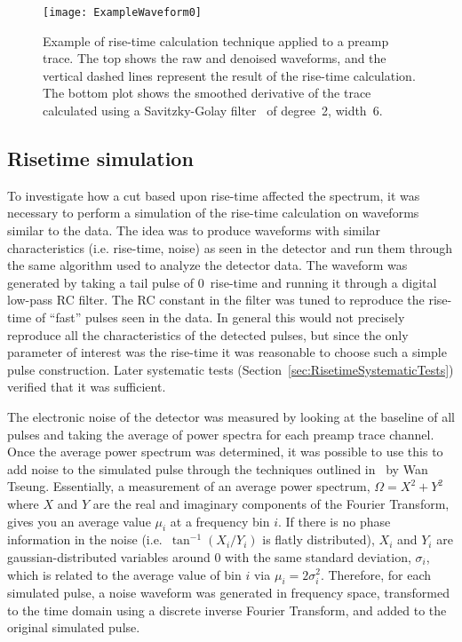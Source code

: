 				\begin{figure}
					\centering
					\texttt{[image: ExampleWaveform0]}
					\caption[Example of rise-time calculation technique applied to a preamp trace]
					{Example of rise-time calculation technique applied to a preamp trace.  
					The top shows the raw and denoised waveforms, and the vertical dashed lines represent the result 
					of the rise-time calculation.  The bottom plot shows the smoothed derivative of the trace calculated 
					using a Savitzky-Golay filter~\cite{Sav64aa} of degree~2, width~6.}
					\label{fig:RisetimeCutsExampleOfPulse}
				\end{figure}					

			\subsection{Risetime simulation}
			\label{sec:RisetimeSimulation}
	
	To investigate how a cut based upon rise-time affected the spectrum, it was necessary to perform a simulation of the rise-time calculation on waveforms similar to the data.  The idea was to produce waveforms with similar characteristics (i.e. rise-time, noise) as seen in the detector and run them through the same algorithm used to analyze the detector data.  The waveform was generated by taking a tail pulse of 0~rise-time and running it through a digital low-pass RC filter.  The RC constant in the filter was tuned to reproduce the rise-time of ``fast'' pulses seen in the data.  In general this would not precisely reproduce all the characteristics of the detected pulses, but since the only parameter of interest was the rise-time it was reasonable to choose such a simple pulse construction.  Later systematic tests (Section~\ref{sec:RisetimeSystematicTests}) verified that it was sufficient.  
	
	The electronic noise of the detector was measured by looking at the baseline of all pulses and taking the average of power spectra for each preamp trace channel.  Once the average power spectrum was determined, it was possible to use this to add noise to the simulated pulse through the techniques outlined in~\cite{WanThesis08} by Wan Tseung.  Essentially, a measurement of an average power spectrum, $\Omega = X^{2} + Y^{2}$ where $X$ and $Y$ are the real and imaginary components of the Fourier Transform, gives you an average value $\mu_{i}$ at a frequency bin $i$.  If there is no phase information in the noise (i.e.~$\tan^{-1} (X_{i}/Y_{i})$ is flatly distributed), $X_{i}$ and $Y_{i}$ are gaussian-distributed variables around 0 with the same standard deviation, $\sigma_{i}$, which is related to the average value of bin $i$ via  $\mu_{i} = 2 \sigma_{i}^{2}$.  Therefore, for each simulated pulse, a noise waveform was generated in frequency space, transformed to the time domain using a discrete inverse Fourier Transform, and added to the original simulated pulse.  
	
